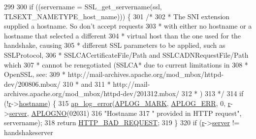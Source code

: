 \begin{DoxyCode}
299 
300         \textcolor{keywordflow}{if} ((servername = SSL\_get\_servername(ssl, TLSEXT\_NAMETYPE\_host\_name))) \{
301             \textcolor{comment}{/*}
302 \textcolor{comment}{             * The SNI extension supplied a hostname. So don't accept requests}
303 \textcolor{comment}{             * with either no hostname or a hostname that selected a different}
304 \textcolor{comment}{             * virtual host than the one used for the handshake, causing}
305 \textcolor{comment}{             * different SSL parameters to be applied, such as SSLProtocol,}
306 \textcolor{comment}{             * SSLCACertificateFile/Path and SSLCADNRequestFile/Path which}
307 \textcolor{comment}{             * cannot be renegotiated (SSLCA* due to current limitations in}
308 \textcolor{comment}{             * OpenSSL, see:}
309 \textcolor{comment}{             * http://mail-archives.apache.org/mod\_mbox/httpd-dev/200806.mbox/
310 \textcolor{comment}{             * and}
311 \textcolor{comment}{             * http://mail-archives.apache.org/mod\_mbox/httpd-dev/201312.mbox/
312 \textcolor{comment}{             * )}
313 \textcolor{comment}{             */}
314             \textcolor{keywordflow}{if} (!\hyperlink{group__APACHE__CORE__CONFIG_ga091cdd45984e865a888a4f8bb8fe107a}{r}->\hyperlink{structrequest__rec_a93baa938b6e2f6c4648cb2429495cd1b}{hostname}) \{
315                 \hyperlink{group__APACHE__CORE__LOG_ga5e6676c87418af7a1d323a116c78ecb4}{ap\_log\_error}(\hyperlink{group__APACHE__CORE__LOG_ga655e126996849bcb82e4e5a14c616f4a}{APLOG\_MARK}, \hyperlink{group__APACHE__CORE__LOG_ga57ad94ed8c92c4306de90479251a5d58}{APLOG\_ERR}, 0, 
      \hyperlink{group__APACHE__CORE__CONFIG_ga091cdd45984e865a888a4f8bb8fe107a}{r}->\hyperlink{structrequest__rec_a4a8059930ce9409cb885fdeef6921b7b}{server}, \hyperlink{group__APACHE__CORE__LOG_ga1dee8a07e06bc5b3de8b89662c2cd666}{APLOGNO}(02031)
316                             \textcolor{stringliteral}{"Hostname %
317                             \textcolor{stringliteral}{" provided in HTTP request"}, servername);
318                 \textcolor{keywordflow}{return} \hyperlink{group__HTTP__Status_ga0c1fdbbb10800664989907cbd3a5a023}{HTTP\_BAD\_REQUEST};
319             \}
320             \textcolor{keywordflow}{if} (\hyperlink{group__APACHE__CORE__CONFIG_ga091cdd45984e865a888a4f8bb8fe107a}{r}->\hyperlink{structrequest__rec_a4a8059930ce9409cb885fdeef6921b7b}{server} != handshakeserver 
}}}
\end{DoxyCode}
